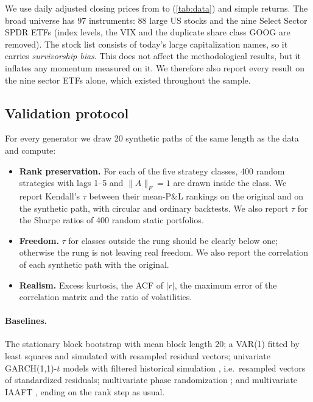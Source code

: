 \documentclass[11pt]{article}
\theoremstyle{definition}
\theoremstyle{remark}
\begin{document}
We use daily adjusted closing prices from \datestart{} to \dateend{} (\cref{tab:data}) and simple returns. The broad universe has 97 instruments:
88 large US stocks and the nine Select Sector SPDR ETFs (index levels, the VIX and the duplicate share class GOOG are removed). The stock list consists
of today's large capitalization names, so it carries \emph{survivorship bias}. This does not affect the methodological results, but it inflates any momentum
measured on it. We therefore also report every result on the nine sector ETFs alone, which existed throughout the sample.

\begin{table}[htbp]
\centering\small

\caption{Data. Excess kurtosis is averaged over assets; the ACF of $|r|$ is the mean autocorrelation of absolute returns over lags 1--5, a measure of volatility clustering.}
\label{tab:data}
\end{table}

\subsection{Validation protocol}

For every generator we draw 20 synthetic paths of the same length as the data and compute:
\begin{itemize}[leftmargin=*,itemsep=2pt]
\item \textbf{Rank preservation.} For each of the five strategy classes, 400 random strategies with lags 1--5 and $\|A\|_F=1$ are drawn inside the class.
We report Kendall's $\tau$ \citep{kendall1938} between their mean-P\&L rankings on the original and on the synthetic path, with circular and ordinary
backtests. We also report $\tau$ for the Sharpe ratios of 400 random static portfolios.
\item \textbf{Freedom.} $\tau$ for classes outside the rung should be clearly below one; otherwise the rung is not leaving real freedom. We also report the correlation
of each synthetic path with the original.
\item \textbf{Realism.} Excess kurtosis, the ACF of $|r|$, the maximum error of the correlation matrix and the ratio of volatilities.
\end{itemize}

\paragraph{Baselines.} The stationary block bootstrap \citep{politis1994} with mean block length 20; a VAR(1) fitted by least squares and simulated with resampled
residual vectors; univariate GARCH(1,1)-$t$ models with filtered historical simulation \citep{bollerslev1986,baroneadesi1999}, i.e.\ resampled vectors of standardized
residuals; multivariate phase randomization \citep{prichard1994}; and multivariate IAAFT \citep{schreiber1996,schreiber2000}, ending on the rank step as usual.
\end{document}
